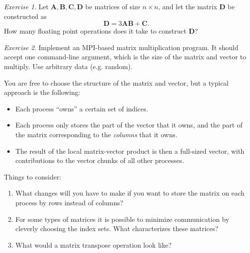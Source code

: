 \documentclass[onecolumn, oneside, a4paper, 11pt]{memoir}
\theoremstyle{remark}
\newtheorem{ex}{Exercise}
\begin{document}
\begin{ex}
  Let $\bm A, \bm B, \bm C, \bm D$ be matrices of size $n \times n$, and let the
  matrix $\bm D$ be constructed as
  \[
    \bm D = 3 \bm A \bm B + \bm C.
  \]
  How many floating point operations does it take to construct $\bm D$?
\end{ex}

\begin{ex}
  Implement an MPI-based matrix multiplication program. It should accept one
  command-line argument, which is the size of the matrix and vector to multiply.
  Use arbitrary data (e.g. random).

  You are free to choose the structure of the matrix and vector, but a typical
  approach is the following:
  \begin{itemize}
  \item Each process ``owns'' a certain set of indices.
  \item Each process only stores the part of the vector that it owns, and the
    part of the matrix corresponding to the \emph{columns} that it owns.
  \item The result of the local matrix-vector product is then a full-sized
    vector, with contributions to the vector chunks of all other processes.
  \end{itemize}

  Things to consider:
  \begin{enumerate}
  \item What changes will you have to make if you want to store the matrix on each
    process by rows instead of columns?
  \item For some types of matrices it is possible to minimize communication by
    cleverly choosing the index sets. What characterizes these matrices?
  \item What would a matrix transpose operation look like?
  \end{enumerate}
\end{ex}
\end{document}
